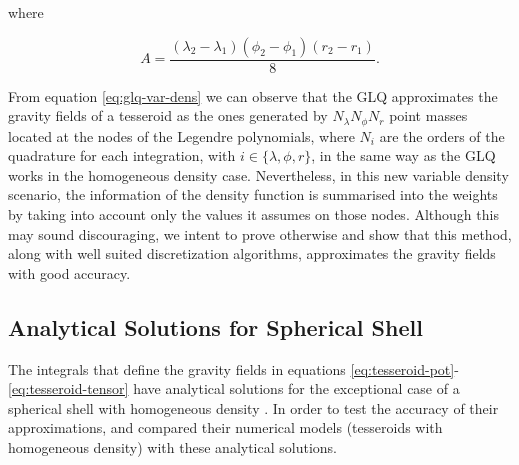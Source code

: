 \documentclass[extra]{gji}
\begin{document}

\noindent where

\begin{equation}
    A = 
    \frac{(\lambda_2 - \lambda_1)(\phi_2 - \phi_1)(r_2 - r_1)}{8}.
\end{equation}

From equation \ref{eq:glq-var-dens} we can observe that the GLQ approximates the gravity fields of a tesseroid as the ones generated by $N_\lambda N_\phi N_r$ point masses located at the nodes of the Legendre polynomials, where $N_i$ are the orders of the quadrature for each integration, with $i \in \{ \lambda, \phi, r \}$, in the same way as the GLQ works in the homogeneous density case.
Nevertheless, in this new variable density scenario, the information of the density function is summarised into the weights by taking into account only the values it assumes on those nodes.
Although this may sound discouraging, we intent to prove otherwise and show that this method, along with well suited discretization algorithms, approximates the gravity fields with good accuracy.


\subsection{Analytical Solutions for Spherical Shell}

The integrals that define the gravity fields in equations \ref{eq:tesseroid-pot}-\ref{eq:tesseroid-tensor} have analytical solutions for the exceptional case of a spherical shell with homogeneous density \citep{Mikuska2006,Grombein2013}.
In order to test the accuracy of their approximations, \citet{Uieda2016} and \citet{Grombein2013} compared their numerical models (tesseroids with homogeneous density) with these analytical solutions.
\end{document}
